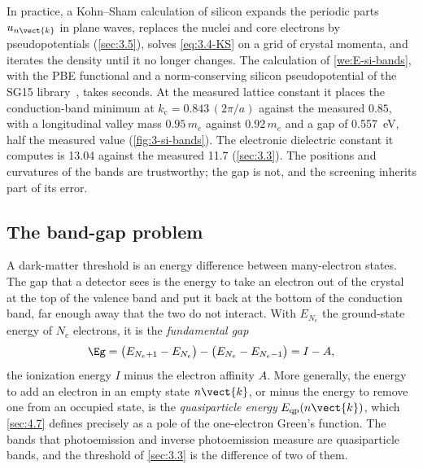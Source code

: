 In practice, a Kohn--Sham calculation of silicon expands the periodic parts $u_{n\vect{k}}$ in plane waves, replaces the nuclei and core electrons by pseudopotentials (\cref{sec:3.5}), solves \cref{eq:3.4-KS} on a grid of crystal momenta, and iterates the density until it no longer changes. The calculation of \cref{we:E-si-bands}, with the PBE functional and a norm-conserving silicon pseudopotential of the SG15 library~\cite{schlipf2015optimization}, takes seconds. At the measured lattice constant it places the conduction-band minimum at $k_{\mathrm{c}} = 0.843\,(2\pi/a)$ against the measured $0.85$, with a longitudinal valley mass $0.95\,m_e$ against $0.92\,m_e$ and a gap of \SI{0.557}{eV}, half the measured value (\cref{fig:3-si-bands}). The electronic dielectric constant it computes is 13.04 against the measured 11.7 (\cref{sec:3.3}). The positions and curvatures of the bands are trustworthy; the gap is not, and the screening inherits part of its error.

\subsection{The band-gap problem}

A dark-matter threshold is an energy difference between many-electron states. The gap that a detector sees is the energy to take an electron out of the crystal at the top of the valence band and put it back at the bottom of the conduction band, far enough away that the two do not interact. With $E_{N_e}$ the ground-state energy of $N_e$ electrons, it is the \emph{fundamental gap}
\begin{equation}
  \Eg = \bigl(E_{N_e+1} - E_{N_e}\bigr) - \bigl(E_{N_e} - E_{N_e-1}\bigr) = I - A ,
  \label{eq:3.4-fundgap}
\end{equation}
the ionization energy $I$ minus the electron affinity $A$. More generally, the energy to add an electron in an empty state $n\vect{k}$, or minus the energy to remove one from an occupied state, is the \emph{quasiparticle energy} $E_{\mathrm{qp}}(n\vect{k})$, which \cref{sec:4.7} defines precisely as a pole of the one-electron Green's function. The bands that photoemission and inverse photoemission measure are quasiparticle bands, and the threshold of \cref{sec:3.3} is the difference of two of them.

